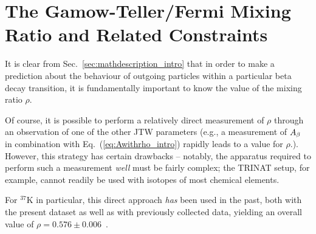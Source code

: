 %














{
	\pagebreak
}
{}
\section{The Gamow-Teller/Fermi Mixing Ratio and Related Constraints}
\label{sec:extractinglambda}
It is clear from Sec.~\ref{sec:mathdescription_intro} that in order to make a prediction about the behaviour of outgoing particles within a particular beta decay transition, it is fundamentally important to know the value of the mixing ratio $\rho$.

Of course, it is possible to perform a relatively direct measurement of $\rho$ through an observation of one of the other \ac{JTW} parameters (e.g., a measurement of $A_{\beta}$ in combination with Eq.~(\ref{eq:Awithrho_intro}) rapidly leads to a value for $\rho$.).  However, this strategy has certain drawbacks -- notably, the apparatus required to perform such a measurement \emph{well} must be fairly complex;  the TRINAT setup, for example, cannot readily be used with isotopes of most chemical elements.  

For $^{37}$K in particular, this direct approach \emph{has} been used in the past, both with the present dataset as well as with previously collected data, yielding an overall value of $\rho=0.576 \pm 0.006$~\cite{ben_Abeta}\cite{shidling2014}\cite{dan_Bnu}.

